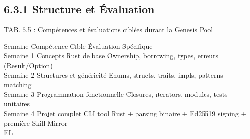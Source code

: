 \documentclass[12pt,landscape,a4paper]{article}
\begin{document}
\subsection{6.3.1 Structure et Évaluation}
\vspace{0.5em}
\vspace{0.5em}
\begin{center}\begin{tabular}TAB. 6.5 : Compétences et évaluations ciblées durant la Genesis Pool\end{tabular}\end{center}
\vspace{0.5em}
\vspace{0.5em}
Semaine       Compétence Cible                 Évaluation Spécifique\\
Semaine 1     Concepts Rust de base            Ownership, borrowing, types, erreurs (Result/Option)\\
Semaine 2     Structures et généricité         Enums, structs, traits, impls, patterns matching\\
Semaine 3     Programmation fonctionnelle      Closures, iterators, modules, tests unitaires\\
Semaine 4     Projet complet                   CLI tool Rust + parsing binaire + Ed25519 signing + première Skill Mirror\\
\vspace{0.5em}
\vspace{0.5em}
\vspace{0.5em}
\vspace{0.5em}
EL\\
\end{document}
